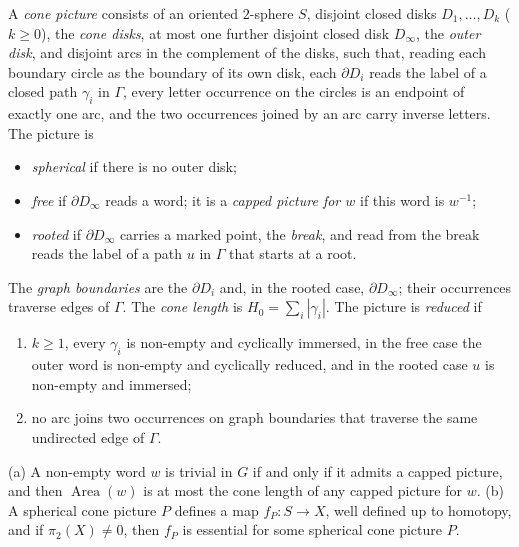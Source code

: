 \documentclass[11pt]{article}
\theoremstyle{definition}
\theoremstyle{plain}
\newcommand{\Area}{\operatorname{Area}}
\begin{document}
\begin{definition}\label{def:picture}
A \emph{cone picture} consists of an oriented $2$-sphere $S$, disjoint closed disks $D_1,\dots,D_k$ ($k\ge0$), the \emph{cone disks}, at most one further disjoint closed disk $D_\infty$, the \emph{outer disk}, and disjoint arcs in the complement of the disks, such that, reading each boundary circle as the boundary of its own disk, each $\partial D_i$ reads the label of a closed path $\gamma_i$ in $\Gamma$, every letter occurrence on the circles is an endpoint of exactly one arc, and the two occurrences joined by an arc carry inverse letters. The picture is
\begin{itemize}[itemsep=0pt]
\item \emph{spherical} if there is no outer disk;
\item \emph{free} if $\partial D_\infty$ reads a word; it is a \emph{capped picture for $w$} if this word is $w^{-1}$;
\item \emph{rooted} if $\partial D_\infty$ carries a marked point, the \emph{break}, and read from the break reads the label of a path $u$ in $\Gamma$ that starts at a root.
\end{itemize}
The \emph{graph boundaries} are the $\partial D_i$ and, in the rooted case, $\partial D_\infty$; their occurrences traverse edges of $\Gamma$. The \emph{cone length} is $H_0=\sum_i|\gamma_i|$. The picture is \emph{reduced} if
\begin{enumerate}[label=\textup{(R\arabic*)},itemsep=0pt]
\item $k\ge1$, every $\gamma_i$ is non-empty and cyclically immersed, in the free case the outer word is non-empty and cyclically reduced, and in the rooted case $u$ is non-empty and immersed;
\item no arc joins two occurrences on graph boundaries that traverse the same undirected edge of $\Gamma$.
\end{enumerate}
\end{definition}

\begin{lemma}\label{lem:pictures}
\textup{(a)} A non-empty word $w$ is trivial in $G$ if and only if it admits a capped picture, and then $\Area(w)$ is at most the cone length of any capped picture for $w$.
\textup{(b)} A spherical cone picture $P$ defines a map $f_P\colon S\to X$, well defined up to homotopy, and if $\pi_2(X)\neq0$, then $f_P$ is essential for some spherical cone picture $P$.
\end{lemma}
\end{document}
